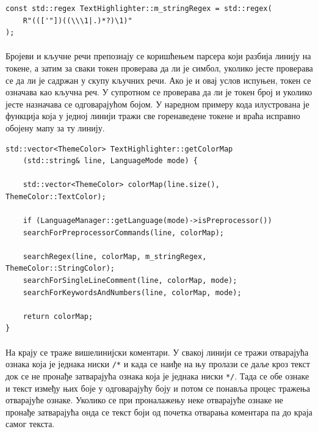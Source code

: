 \documentclass[12pt,oneside]{memoir}
\begin{document}
\begin{verbatim}
const std::regex TextHighlighter::m_stringRegex = std::regex(
	R"((['"])((\\\1|.)*?)\1)"
);
\end{verbatim}

\paragraph{}
Бројеви и кључне речи препознају се коришћењем парсера који разбија линију на токене, а затим за сваки токен проверава да ли је симбол, уколико јесте проверава се да ли је садржан у скупу кључних речи. Ако је и овај услов испуњен, токен се означава 
као кључна реч. У супротном се проверава да ли је токен број и уколико јесте
назначава се одговарајућом бојом. У наредном примеру кода илустрована је функција
која у једној линији тражи све горенаведене токене и враћа исправно обојену
мапу за ту линију.

\begin{verbatim}
std::vector<ThemeColor> TextHighlighter::getColorMap
	(std::string& line, LanguageMode mode) {
		
	std::vector<ThemeColor> colorMap(line.size(), ThemeColor::TextColor);
	
	if (LanguageManager::getLanguage(mode)->isPreprocessor())
	searchForPreprocessorCommands(line, colorMap);
	
	searchRegex(line, colorMap, m_stringRegex, ThemeColor::StringColor);
	searchForSingleLineComment(line, colorMap, mode);
	searchForKeywordsAndNumbers(line, colorMap, mode);
	
	return colorMap;
}
\end{verbatim}

\paragraph{}
На крају се траже вишелинијски коментари. У свакој линији се тражи отварајућа
ознака која је једнака ниски \verb|/*| и када се наиђе на њу пролази се даље
кроз текст док се не пронађе затварајућа ознака која је једнака ниски \verb|*/|.
Тада се обе ознаке и текст између њих боје у одговарајућу боју и потом се 
понавља процес тражења отварајуће ознаке. Уколико се при проналажењу
неке отварајуће ознаке не пронађе затварајућа онда се текст боји од почетка отварања коментара па до краја самог текста.
\end{document}
